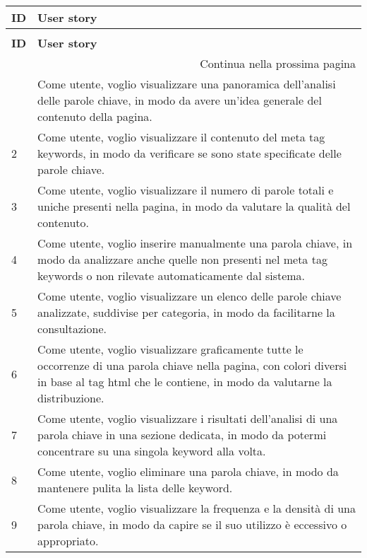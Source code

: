 \renewcommand{\arraystretch}{1.5}
\begin{tabularx}{\textwidth}{lX}
\caption{Tabella delle user story}
\label{tab:user-story} \\
\hline\hline
\textbf{ID} & \textbf{User story}\\
\endfirsthead
    
\caption[]{Tabella delle user story (continua)} \\
\hline\hline
\textbf{ID} & \textbf{User story} \\ 
\endhead
    
\multicolumn{2}{r}{{Continua nella prossima pagina}} \\ 
\endfoot
    
\hline
\endlastfoot

\hline
1 & Come utente, voglio visualizzare una panoramica dell'analisi delle parole chiave, in modo da avere un'idea generale del contenuto della pagina. \\
\hline
2 & Come utente, voglio visualizzare il contenuto del meta tag keywords, in modo da verificare se sono state specificate delle parole chiave. \\
\hline
3 & Come utente, voglio visualizzare il numero di parole totali e uniche presenti nella pagina, in modo da valutare la qualità del contenuto. \\
\hline
4 & Come utente, voglio inserire manualmente una parola chiave, in modo da analizzare anche quelle non presenti nel meta tag keywords o non rilevate automaticamente dal sistema. \\
\hline
5 & Come utente, voglio visualizzare un elenco delle parole chiave analizzate, suddivise per categoria, in modo da facilitarne la consultazione. \\
\hline
6 & Come utente, voglio visualizzare graficamente tutte le occorrenze di una parola chiave nella pagina, con colori diversi in base al tag \gls{html} che le contiene, in modo da valutarne la distribuzione. \\
\hline
7 & Come utente, voglio visualizzare i risultati dell’analisi di una parola chiave in una sezione dedicata, in modo da potermi concentrare su una singola keyword alla volta. \\
\hline
8 & Come utente, voglio eliminare una parola chiave, in modo da mantenere pulita la lista delle keyword. \\
\hline
9 & Come utente, voglio visualizzare la frequenza e la densità di una parola chiave, in modo da capire se il suo utilizzo è eccessivo o appropriato. \\

\end{tabularx}
